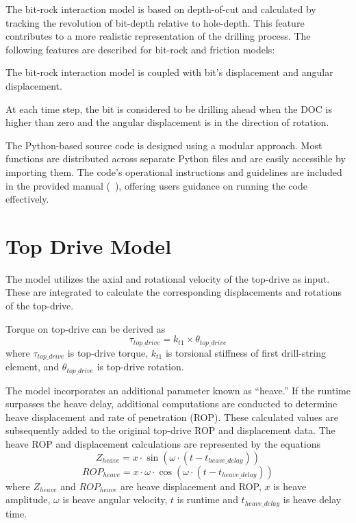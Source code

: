 The bit-rock interaction model is based on depth-of-cut and calculated by tracking the revolution of bit-depth relative to hole-depth. This feature contributes to a more realistic representation of the drilling process.  The following features are described for bit-rock and friction models:
\begin{bulletedlist}
    \item The bit-rock interaction model is coupled with bit's displacement and angular displacement.
    \item At each time step, the bit is considered to be drilling ahead when the DOC is higher than zero and the angular displacement is in the direction of rotation.
\end{bulletedlist}

The Python-based source code is designed using a modular approach.  Most functions are distributed across separate Python files and are easily accessible by importing them. The code's operational instructions and guidelines are included in the provided manual (~\cite{ref:dixit2021a}), offering users guidance on running the code effectively.

\section{Top Drive Model}
The model utilizes the axial and rotational velocity of the top-drive as input.  These are integrated to calculate the corresponding displacements and rotations of the top-drive.

Torque on top-drive can be derived as
\begin{equation}\label{TorqueEQ}
  \tau_{top\_drive} = k_{t1} \times \theta_{top\_drive}
\end{equation}
where $\tau_{top\_drive}$ is top-drive torque, $k_{t1}$ is torsional stiffness of first drill-string element, and $\theta_{top\_drive}$ is top-drive rotation.

The model incorporates an additional parameter known as ``heave.'' If the runtime surpasses the heave delay, additional computations are conducted to determine heave displacement and rate of penetration (ROP). These calculated values are subsequently added to the original top-drive ROP and displacement data. The heave ROP and displacement calculations are represented by the equations
\begin{equation}\label{Z_heave}
  Z_{heave} = x \cdot \sin(\omega \cdot (t - t_{heave\_delay}))
\end{equation}
\begin{equation}\label{ROP_heave}
  ROP_{heave} = x \cdot \omega \cdot \cos(\omega \cdot (t - t_{heave\_delay}))
\end{equation}
where 
$Z_{heave}$ and $ROP_{heave}$ are heave displacement and ROP, $x$ is heave amplitude, $\omega$ is heave angular velocity, $t$ is runtime and $t_{heave\_delay}$ is heave delay time.
 

